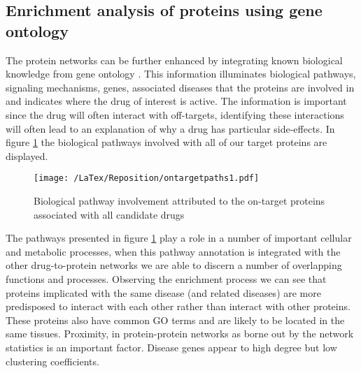 \documentclass[preprint,11pt]{elsarticle}
\begin{document}
\subsection{Enrichment analysis of proteins using gene ontology}
The protein networks can be further enhanced by integrating known biological knowledge from gene ontology \cite{Ashburner00, Deng04}. This information illuminates biological pathways, signaling mechanisms, genes, associated diseases that the proteins are involved in and indicates where the drug of interest is active.  The information is important since the drug will often interact with off-targets, identifying these interactions will often lead to an explanation of why a drug has particular side-effects. In figure \ref{pathway1} the biological pathways involved with all of our target proteins are displayed.

\begin{figure}[h]
  \begin{center}
	 \texttt{[image: /LaTex/Reposition/ontargetpaths1.pdf]} %
   \end{center}
 \caption{Biological pathway involvement attributed to the on-target proteins associated with all candidate drugs}
\label{pathway1}
\end{figure}

The pathways presented in figure \ref{pathway1} play a role in a number of important cellular and metabolic processes, when this pathway annotation is integrated with the other drug-to-protein networks we are able to discern a number of overlapping functions and processes. Observing the enrichment process we can see that proteins implicated with the same disease (and related diseases) are more predisposed to interact with each other rather than interact with other proteins. These proteins also have common GO terms and are likely to be located in the same tissues. Proximity, in protein-protein networks as borne out by the network statistics is an important factor. Disease genes appear to high degree but low clustering coefficients.
\end{document}
